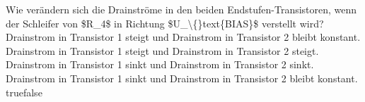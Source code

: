     {Wie verändern sich die Drainströme in den beiden Endstufen-Transistoren, wenn der Schleifer von \$R\_4\$ in Richtung \$U\_\textbackslash\{\}text\{BIAS\}\$ verstellt wird?}
    {Drainstrom in Transistor 1 steigt und Drainstrom in Transistor 2 bleibt konstant.}
    {Drainstrom in Transistor 1 steigt und Drainstrom in Transistor 2 steigt.}
    {Drainstrom in Transistor 1 sinkt und Drainstrom in Transistor 2 sinkt.}
    {Drainstrom in Transistor 1 sinkt und Drainstrom in Transistor 2 bleibt konstant.}
    {true}{false}